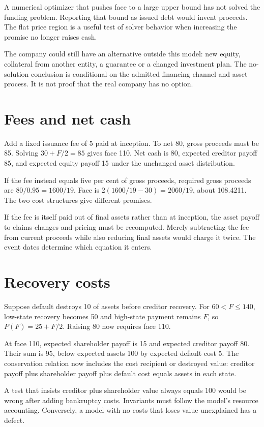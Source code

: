 A numerical optimizer that pushes face to a large upper bound has not solved the funding problem. Reporting that bound as issued debt would invent proceeds. The flat price region is a useful test of solver behavior when increasing the promise no longer raises cash.

The company could still have an alternative outside this model: new equity, collateral from another entity, a guarantee or a changed investment plan. The no-solution conclusion is conditional on the admitted financing channel and asset process. It is not proof that the real company has no option.

\section{Fees and net cash}
Add a fixed issuance fee of 5 paid at inception. To net 80, gross proceeds must be 85. Solving $30+F/2=85$ gives face 110. Net cash is 80, expected creditor payoff 85, and expected equity payoff 15 under the unchanged asset distribution.

If the fee instead equals five per cent of gross proceeds, required gross proceeds are $80/0.95=1600/19$. Face is $2(1600/19-30)=2060/19$, about 108.4211. The two cost structures give different promises.

If the fee is itself paid out of final assets rather than at inception, the asset payoff to claims changes and pricing must be recomputed. Merely subtracting the fee from current proceeds while also reducing final assets would charge it twice. The event dates determine which equation it enters.

\section{Recovery costs}
Suppose default destroys 10 of assets before creditor recovery. For $60<F\leq140$, low-state recovery becomes 50 and high-state payment remains $F$, so $P(F)=25+F/2$. Raising 80 now requires face 110.

At face 110, expected shareholder payoff is 15 and expected creditor payoff 80. Their sum is 95, below expected assets 100 by expected default cost 5. The conservation relation now includes the cost recipient or destroyed value: creditor payoff plus shareholder payoff plus default cost equals assets in each state.

A test that insists creditor plus shareholder value always equals 100 would be wrong after adding bankruptcy costs. Invariants must follow the model's resource accounting. Conversely, a model with no costs that loses value unexplained has a defect.

